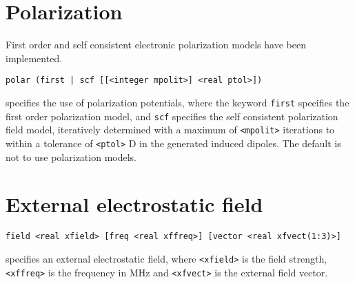 \section{Polarization}
First order and self consistent electronic polarization models have
been implemented.
\begin{description}
\item
\begin{verbatim}
polar (first | scf [[<integer mpolit>] <real ptol>])
\end{verbatim}
specifies the use of polarization potentials,
where the keyword {\tt first} specifies the first order polarization
model, and {\tt scf} specifies the self consistent polarization field
model, iteratively determined with a maximum of \verb+<mpolit>+
iterations to within a tolerance of \verb+<ptol>+ D in the generated
induced dipoles. The default is not to use polarization models.
\end{description}

\section{External electrostatic field}
\begin{description}

\item
\begin{verbatim}
field <real xfield> [freq <real xffreq>] [vector <real xfvect(1:3)>]
\end{verbatim}
specifies an external electrostatic field,
where \verb+<xfield>+ is the field strength, \verb+<xffreq>+ is the
frequency in MHz and \verb+<xfvect>+ is the external field vector.
\end{description}

